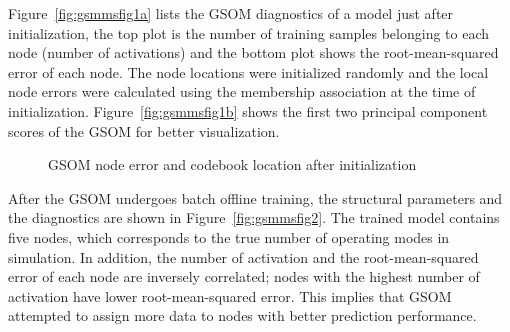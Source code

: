 \documentclass[review,3p]{elsarticle}
\renewcommand\[{\begin{equation}}
\renewcommand\]{\end{equation}}
\begin{document}
Figure~\ref{fig:gsmmsfig1a} lists the GSOM diagnostics of a model just after
initialization, the top plot is the number of training samples belonging to each node (number of activations) and the bottom plot shows the root-mean-squared error of each node. 
The node locations were initialized randomly and the local node errors were calculated
using the membership association at the time of initialization.
Figure~\ref{fig:gsmmsfig1b} shows the first two principal component scores of the GSOM for better visualization.
\begin{figure}[htpb]
  \centering
  \caption{GSOM node error and codebook location after initialization}
  \label{fig:gsmmsfig1}
\end{figure}

After the GSOM undergoes batch offline training, the structural parameters
and the diagnostics are shown in Figure~\ref{fig:gsmmsfig2}.
The trained model contains five nodes, which corresponds to the true number of operating modes in simulation.
In addition, the number of activation and the root-mean-squared error of each node are
inversely correlated; nodes with the highest number of activation have lower
root-mean-squared error. This implies that GSOM attempted to assign more data to nodes with better prediction performance.
\end{document}
